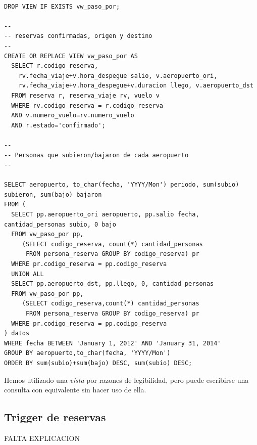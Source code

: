\documentclass[a4paper,10pt]{article}
\begin{document}
\begin{verbatim}
 
DROP VIEW IF EXISTS vw_paso_por;

--
-- reservas confirmadas, origen y destino
--
CREATE OR REPLACE VIEW vw_paso_por AS
  SELECT r.codigo_reserva,
    rv.fecha_viaje+v.hora_despegue salio, v.aeropuerto_ori,
    rv.fecha_viaje+v.hora_despegue+v.duracion llego, v.aeropuerto_dst
  FROM reserva r, reserva_viaje rv, vuelo v
  WHERE rv.codigo_reserva = r.codigo_reserva
  AND v.numero_vuelo=rv.numero_vuelo
  AND r.estado='confirmado';

--
-- Personas que subieron/bajaron de cada aeropuerto
--

SELECT aeropuerto, to_char(fecha, 'YYYY/Mon') periodo, sum(subio) subieron, sum(bajo) bajaron 
FROM (
  SELECT pp.aeropuerto_ori aeropuerto, pp.salio fecha, cantidad_personas subio, 0 bajo
  FROM vw_paso_por pp,
     (SELECT codigo_reserva, count(*) cantidad_personas
      FROM persona_reserva GROUP BY codigo_reserva) pr
  WHERE pr.codigo_reserva = pp.codigo_reserva
  UNION ALL
  SELECT pp.aeropuerto_dst, pp.llego, 0, cantidad_personas
  FROM vw_paso_por pp,
     (SELECT codigo_reserva,count(*) cantidad_personas
      FROM persona_reserva GROUP BY codigo_reserva) pr
  WHERE pr.codigo_reserva = pp.codigo_reserva
) datos
WHERE fecha BETWEEN 'January 1, 2012' AND 'January 31, 2014'
GROUP BY aeropuerto,to_char(fecha, 'YYYY/Mon')
ORDER BY sum(subio)+sum(bajo) DESC, sum(subio) DESC;

\end{verbatim}

Hemos utilizado una \textit{vista} por razones de legibilidad, pero puede escribirse una consulta con equivalente sin hacer uso de ella.


\subsection{Trigger de reservas}

FALTA EXPLICACION

\begin{verbatim}
 

\end{verbatim}


\newpage
% 
\end{document}
